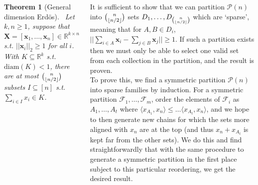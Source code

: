 \documentclass{tikzposter} %
\newcommand{\mc}{\mathcal}
\DeclarePairedDelimiter{\floor}{\lfloor}{\rfloor}
\newtheorem{theorem}{Theorem}
\begin{document}
\begin{columns}
{    \begin{theorem}[General dimension Erd\"os]
    \ Let $k, n \ge 1$, suppose that $\bm{X} = [\bm{x}_1, \dots, \bm{x}_n] \in \mathbb{R}^{k \times n}$ s.t. $||\bm{x}_i ||_2 \ge 1$ for all $i$. With $K \subseteq \mathbb{R}^k$ s.t. $\mathrm{diam}(K) < 1$, there are at most ${n \choose \floor{n/2}}$ subsets $I \subseteq [n]$ s.t. $\sum_{i \in I} x_i \in K$.
    \end{theorem}
    \hphantom{}

    It is sufficient to show that we can partition $\mc{P}(n)$ into ${n \choose \floor{n/2}}$ sets $D_1, \dots, D_{n \choose \floor{n/2}}$ which are `sparse', meaning that for $A, B \in D_i$, $|| \sum_{i \in A} \bm{x}_i - \sum_{j \in B} \bm{x}_j || \ge 1$. If such a partition exists then we must only be able to select one valid set from each collection in the partition, and the result is proven. \\

    To prove this, we find a symmetric partition $\mc{P}(n)$ into sparse families by induction. For a symmetric partition $\mc{F}_1, \dots, \mc{F}_m$, order the elements of $\mc{F}_i$ as $A_1, \dots, A_t$ where $\langle x_{A_1}, x_n \rangle \le \dots \langle x_{A_t}, x_n \rangle$, and we hope to then generate new chains for which the sets more aligned with $x_n$ are at the top (and thus $x_n + x_{A_t}$ is kept far from the other sets). We do this and find straightforwardly that with the same procedure to generate a symmetric partition in the first place subject to this particular reordering, we get the desired result. \\


    }
\end{columns}
\end{document}
